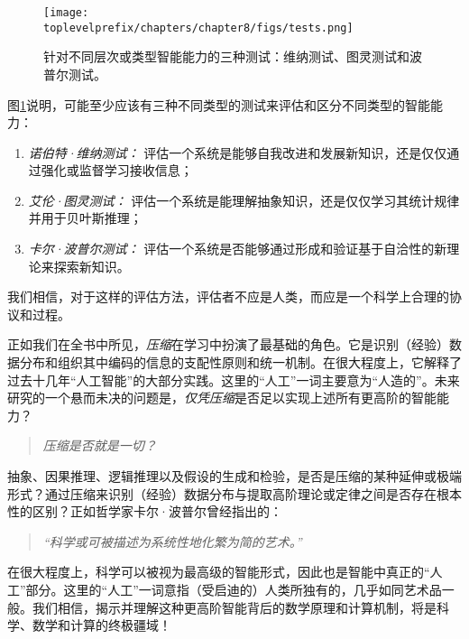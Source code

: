 \documentclass[../../book-main.tex]{subfiles}
\begin{document}
\begin{figure}[t]
    \centering
    \texttt{[image: \\toplevelprefix/chapters/chapter8/figs/tests.png]}
    \caption{针对不同层次或类型智能能力的三种测试：维纳测试、图灵测试和波普尔测试。}
    \label{fig:three-tests}
\end{figure}

图\ref{fig:three-tests}说明，可能至少应该有三种不同类型的测试来评估和区分不同类型的智能能力：
\begin{enumerate}
    \item {\em 诺伯特·维纳测试：} 评估一个系统是能够自我改进和发展新知识，还是仅仅通过强化或监督学习接收信息；
    \item {\em 艾伦·图灵测试：} 评估一个系统是能理解抽象知识，还是仅仅学习其统计规律并用于贝叶斯推理；
    \item {\em 卡尔·波普尔测试：} 评估一个系统是否能够通过形成和验证基于自洽性的新理论来探索新知识。
\end{enumerate}
我们相信，对于这样的评估方法，评估者不应是人类，而应是一个科学上合理的协议和过程。



正如我们在全书中所见，\textit{压缩}在学习中扮演了最基础的角色。它是识别（经验）数据分布和组织其中编码的信息的支配性原则和统一机制。在很大程度上，它解释了过去十几年“人工智能”的大部分实践。这里的“人工”一词主要意为“人造的”。未来研究的一个悬而未决的问题是，\textit{仅凭压缩}是否足以实现上述所有更高阶的智能能力？
\begin{quote}
\begin{center}
        {\em 压缩是否就是一切？}
\end{center}
\end{quote}
抽象、因果推理、逻辑推理以及假设的生成和检验，是否是压缩的某种延伸或极端形式？通过压缩来识别（经验）数据分布与提取高阶理论或定律之间是否存在根本性的区别？正如哲学家卡尔·波普尔曾经指出的：
\begin{quote}
    \begin{center}
    {\em “科学或可被描述为系统性地化繁为简的艺术。”}
    \end{center}
\end{quote}
在很大程度上，科学可以被视为最高级的智能形式，因此也是智能中真正的“人工”部分。这里的“人工”一词意指（受启迪的）人类所独有的，几乎如同艺术品一般。我们相信，揭示并理解这种更高阶智能背后的数学原理和计算机制，将是科学、数学和计算的终极疆域！
\end{document}
